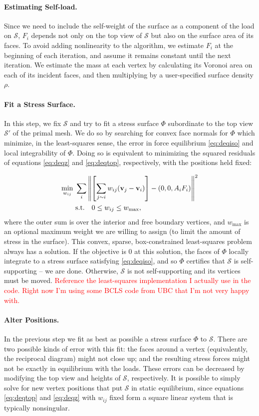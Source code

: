 \documentclass[annual]{acmsiggraph}
\def\SS{{\mathcal S}}
\newcommand{\todo}[1]{\textcolor{red}{#1}}
\begin{document}
\paragraph{Estimating Self-load.}
Since we need to include the self-weight of the surface as a component of the load on $\SS$, $F_i$ depends not only on the top view of $\SS$ but also on the surface area of its faces. To avoid adding nonlinearity to the algorithm, we estimate $F_i$ at the beginning of each iteration, and assume it remains constant until the next iteration. We estimate the mass at each vertex by calculating its Voronoi area on each of its incident faces, and then multiplying by a user-specified surface density $\rho$. 

\paragraph{Fit a Stress Surface.}
In this step, we fix $\SS$ and try to fit a stress surface $\Phi$ subordinate to the top view $\SS'$ of the primal mesh. We do so by searching for convex face normals for $\Phi$ which minimize, in the least-squares sense, the error in force equilibrium \eqref{eq:deqiso} and local integrability of $\Phi$. Doing so is equivalent to minimizing the squared residuals of equations \eqref{eq:deqz} and \eqref{eq:deqtop}, respectively, with the positions held fixed:

\begin{align*}
\min_{w_{ij}}\ &\sum_i \left\| \left[\sum_{j\sim i} w_{ij} ({\mathbf v}_j-{\mathbf v}_i)\right] - (0,0,A_i F_i) \right\|^2\\
&\textrm{s.t.}\quad 0 \leq w_{ij} \leq w_{\textrm{max}},
\end{align*}
where the outer sum is over the interior and free boundary vertices, and $w_\textrm{max}$ is an optional maximum weight we are willing to assign (to limit the amount of stress in the surface). This convex, sparse, box-constrained least-squares problem always has a solution. If the objective is $0$ at this solution, the faces of $\Phi$ locally integrate to a stress surface satisfying \eqref{eq:deqiso}, and so $\Phi$ certifies that $\SS$ is self-supporting -- we are done. Otherwise, $\SS$ is not self-supporting and its vertices must be moved. \todo{Reference the least-squares implementation I actually use in the code. Right now I'm using some BCLS code from UBC that I'm not very happy with.}

\paragraph{Alter Positions.}
In the previous step we fit as best as possible a stress surface $\Phi$ to $\SS$. There are two possible kinds of error with this fit: the faces around a vertex (equivalently, the reciprocal diagram) might not close up; and the resulting stress forces might not be exactly in equilibrium with the loads. These errors can be decreased by modifying the top view and heights of $\SS$, respectively. It is possible to simply solve for new vertex positions that put $\SS$ in static equilibrium, since equations \eqref{eq:deqtop} and \eqref{eq:deqz} with $w_{ij}$ fixed form a square linear system that is typically nonsingular.
\end{document}
